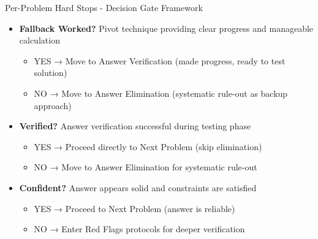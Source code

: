 \documentclass{article}
\begin{document}
\begin{timebox}{Per-Problem Hard Stops - Decision Gate Framework}
\begin{itemize}[nosep]
\begin{itemize}[nosep]
   \item NO → Move to Pivot Strategy (need different approach)
   \end{itemize}
\item \textbf{Fallback Worked?} Pivot technique providing clear progress and manageable calculation
   \begin{itemize}[nosep]
   \item YES → Move to Answer Verification (made progress, ready to test solution)
   \item NO → Move to Answer Elimination (systematic rule-out as backup approach)
   \end{itemize}
\item \textbf{Verified?} Answer verification successful during testing phase
   \begin{itemize}[nosep]
   \item YES → Proceed directly to Next Problem (skip elimination)
   \item NO → Move to Answer Elimination for systematic rule-out
   \end{itemize}
\item \textbf{Confident?} Answer appears solid and constraints are satisfied
   \begin{itemize}[nosep]
   \item YES → Proceed to Next Problem (answer is reliable)
   \item NO → Enter Red Flags protocols for deeper verification
   \end{itemize}
\end{itemize}
\end{timebox}
\end{document}
